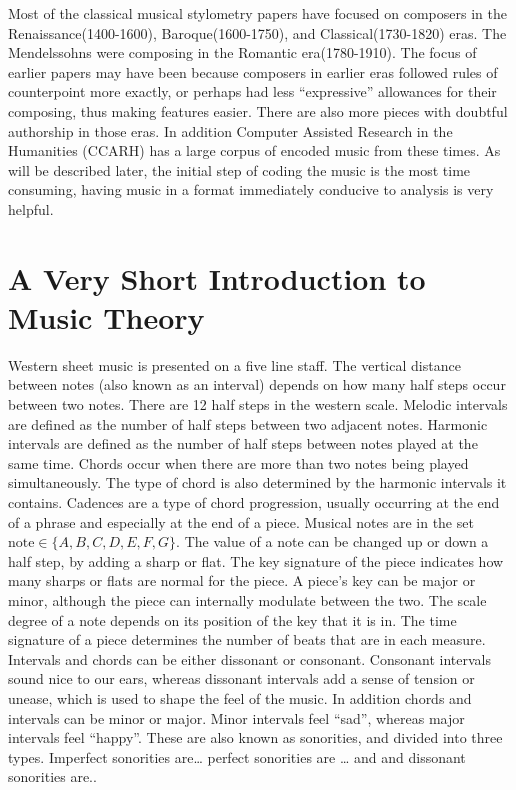 \documentclass[12pt,twoside]{reedthesis}
\theoremstyle{definition}
\theoremstyle{definition}
\theoremstyle{definition}
\theoremstyle{remark}
\begin{document}
Most of the classical musical stylometry papers have focused on
composers in the Renaissance(1400-1600), Baroque(1600-1750), and
Classical(1730-1820) eras. The Mendelssohns were composing in the
Romantic era(1780-1910). The focus of earlier papers may have been
because composers in earlier eras followed rules of counterpoint more
exactly, or perhaps had less ``expressive'' allowances for their
composing, thus making features easier. There are also more pieces with
doubtful authorship in those eras. In addition Computer Assisted
Research in the Humanities (CCARH) has a large corpus of encoded music
from these times. As will be described later, the initial step of coding
the music is the most time consuming, having music in a format
immediately conducive to analysis is very helpful.

\section{A Very Short Introduction to Music
Theory}\label{a-very-short-introduction-to-music-theory}

Western sheet music is presented on a five line staff. The vertical
distance between notes (also known as an interval) depends on how many
half steps occur between two notes. There are 12 half steps in the
western scale. Melodic intervals are defined as the number of half steps
between two adjacent notes. Harmonic intervals are defined as the number
of half steps between notes played at the same time. Chords occur when
there are more than two notes being played simultaneously. The type of
chord is also determined by the harmonic intervals it contains. Cadences
are a type of chord progression, usually occurring at the end of a
phrase and especially at the end of a piece. Musical notes are in the
set \(\text{note} \in \{A,B,C,D,E,F,G\}\). The value of a note can be
changed up or down a half step, by adding a sharp or flat. The key
signature of the piece indicates how many sharps or flats are normal for
the piece. A piece's key can be major or minor, although the piece can
internally modulate between the two. The scale degree of a note depends
on its position of the key that it is in. The time signature of a piece
determines the number of beats that are in each measure. Intervals and
chords can be either dissonant or consonant. Consonant intervals sound
nice to our ears, whereas dissonant intervals add a sense of tension or
unease, which is used to shape the feel of the music. In addition chords
and intervals can be minor or major. Minor intervals feel ``sad'',
whereas major intervals feel ``happy''. These are also known as
sonorities, and divided into three types. Imperfect sonorities
are\ldots{} perfect sonorities are \ldots{} and and dissonant sonorities
are..
\end{document}

